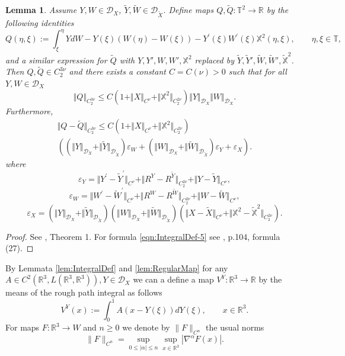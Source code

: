 \documentclass[11pt,a4paper,reqno]{amsart}%
\theoremstyle{plain}
\theoremstyle{remark}
\theoremstyle{plain}
\newtheorem{lemma}[theorem]{Lemma}
\numberwithin{equation}{section}
\newcommand{\eps}{\varepsilon}
\def\Rnu{{\mathbb R}}
\begin{document}
\begin{lemma}\label{lem:IntegralProp}
Assume $Y,W\in \mathcal{D}_X$, $\tilde{Y},\tilde{W}\in
\mathcal{D}_{\tilde{X}}$. Define maps $Q,\tilde{Q}:\mathbb{T}^2\to\Rnu$ by
the following identities
\begin{equation}
Q(\eta,\xi):=\int_{\xi}^{\eta}YdW-Y(\xi)(W(\eta)-W(\xi))-Y^\prime(\xi)W^\prime(\xi)\mathbb{X}^2(\eta,\xi),\qquad\eta,\xi\in
\mathbb{T},\label{eqn:IntegralDef-2}
\end{equation}
and a similar expression for $\tilde{Q}$ with $Y,Y',W,W',\mathbb{X}^2$ replaced by $\tilde{Y},\tilde{Y}',\tilde{W},\tilde{W}',\tilde{\mathbb{X}}^2$.
Then $Q,\tilde{Q}\in C_2^{3\nu}$ and there exists a constant
$C=C(\nu)>0$ such that for all $Y,W\in \mathcal{D}_X$
\begin{equation}
\Vert Q\Vert_{C_2^{3\nu}}\leq
C(1+\Vert X\Vert_{C^{\nu}}+\Vert \mathbb{X}^2\Vert_{C_2^{2\nu}})\Vert Y\Vert_{\mathcal{D}_X}\Vert W\Vert_{\mathcal{D}_X}.\label{eqn:IntegralDef-3}
\end{equation}
Furthermore,
\begin{multline}\label{eqn:IntegralDef-5}
\Vert Q-\tilde{Q}\Vert_{C_2^{3\nu}}\leq
C(1+\Vert X\Vert_{C^{\nu}}+\Vert \mathbb{X}^2\Vert_{C_2^{2\nu}})\\
((\Vert Y\Vert_{\mathcal{D}_X}+\Vert \tilde{Y}\Vert_{\mathcal{D}_{\tilde{X}}})\eps_W+
(\Vert W\Vert_{\mathcal{D}_X}+\Vert \tilde{W}\Vert_{\mathcal{D}_{\tilde{X}}})\eps_Y+\eps_X).
\end{multline}
where
\[
\eps_Y=\Vert Y^\prime-\tilde{Y}^\prime\Vert_{C^{\nu}}+\Vert R^Y-R^{\tilde{Y}}\Vert_{C_2^{2\nu}}+\Vert Y-\tilde{Y}\Vert_{C^{\nu}},
\]
\[
\eps_W=\Vert W^\prime-\tilde{W}^\prime\Vert_{C^{\nu}}+\Vert R^W-R^{\tilde{W}}\Vert_{C_2^{2\nu}}+\Vert W-\tilde{W}\Vert_{C^{\nu}},
\]
\[
\eps_X=(\Vert Y\Vert_{\mathcal{D}_X}+\Vert \tilde{Y}\Vert_{\mathcal{D}_{\tilde{X}}})(\Vert W\Vert_{\mathcal{D}_X}+\Vert \tilde{W}\Vert_{\mathcal{D}_{\tilde{X}}})
(\Vert X-\tilde{X}\Vert_{C^{\nu}}+\Vert \mathbb{X}^2-\mathbb{\tilde{X}}^2\Vert_{C_2^{2\nu}}).
\]
\end{lemma}
\begin{proof}%
See \cite{[Gubinelli-2004]}, Theorem 1. For formula
\eqref{eqn:IntegralDef-5} see   \cite{[Gubinelli-2004]}, p.104,
formula (27).
\end{proof}
By Lemmata \ref{lem:IntegralDef} and \ref{lem:RegularMap} for any
$A\in C^2(\Rnu^3,L(\Rnu^3,\Rnu^3)),Y\in\mathcal{D}_X$ we can a
define a map  $V^Y:\Rnu^3\to\Rnu$  by the means of the rough path integral as follows
\begin{equation}
V^Y(x):=\int_{0}^1A(x-Y(\xi))d Y(\xi),\qquad x\in\Rnu^3.
\end{equation}
For maps $F:\mathbb{R}^3\to W$ and $n\ge 0$ we denote by $\|F\|_{C^n}$ the usual norms
$$
\|F\|_{C^n} =   \sup_{0\le  |\alpha|\le n} \sup_{x\in\mathbb{R}^3}   |\nabla^\alpha F(x)|.
$$
\end{document}
